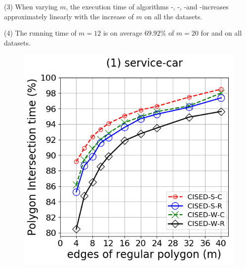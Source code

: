 \ni(3) When varying $m$, the execution time of algorithms \cist-\rpia, \cist-\cpia, \cista-\rpia and \cista-\cpia increases approximately linearly with the increase of $m$ on all the datasets.

\ni(4) The running time of $m=12$ is on average $69.92\%$ of $m=20$ for \cist and \cista on all datasets.




\begin{figure}[tb!]
	\centering
	\includegraphics[scale = 0.275]{Figures/Exp-M-poly-time-ratio-service.png}\hspace{3ex}

\end{figure}

